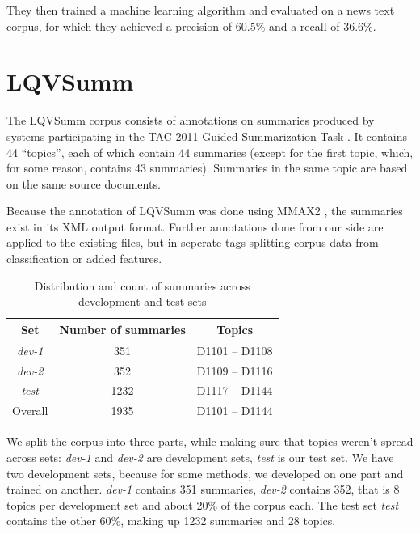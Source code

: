 \documentclass[a4paper,10pt]{scrartcl}
\theoremstyle{style}
\begin{document}
They then trained a machine learning algorithm \citep{cohen1996learning} and evaluated on a news text corpus, for which they achieved a precision of 60.5\% and a recall of 36.6\%.

\section{LQVSumm}
\label{corpus_study}
The LQVSumm corpus consists of annotations on summaries produced by systems participating in the TAC 2011 Guided Summarization Task \citep{owczarzak2011overview}. It contains 44 ``topics'', each of which contain 44 summaries (except for the first topic, which, for some reason, contains 43 summaries).
Summaries in the same topic are based on the same source documents.

Because the annotation of LQVSumm was done using MMAX2 \citep{muller2006multi}, the summaries exist in its XML output format. Further annotations done from our side are applied to the existing files, but in seperate tags splitting corpus data from classification or added features.

\begin{table}
\begin{center}
\begin{tabular}{|c|c|c|}
\hline
\textbf{Set} & \textbf{Number of summaries} & \textbf{Topics}\\
\hline
\textit{dev-1} & 351 & D1101 -- D1108\\
\hline
\textit{dev-2} & 352 & D1109 -- D1116\\
\hline
\textit{test} & 1232 & D1117 -- D1144\\
\hline\hline
Overall & 1935 & D1101 -- D1144\\
\hline
\end{tabular}
\end{center}
\label{testsets}
\caption{Distribution and count of summaries across development and test sets}
\end{table}

We split the corpus into three parts, while making sure that topics weren't spread across sets: \textit{dev-1} and \textit{dev-2} are development sets, \textit{test} is our test set. We have two development sets, because for some methods, we developed on one part and trained on another.
\textit{dev-1} contains 351 summaries, \textit{dev-2} contains 352, that is 8 topics per development set and about 20\% of the corpus each.
The test set \textit{test} contains the other 60\%, making up 1232 summaries and 28 topics.
\end{document}

